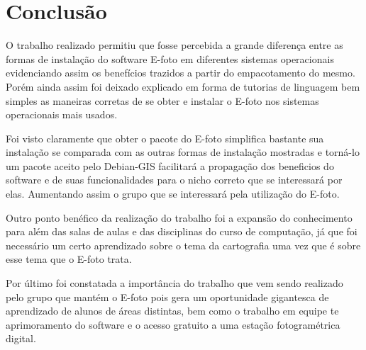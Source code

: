 \chapter{Conclusão}

O trabalho realizado permitiu que fosse percebida a grande diferença entre as formas de instalação do software E-foto em diferentes sistemas operacionais evidenciando assim os benefícios trazidos a partir do empacotamento do mesmo. Porém ainda assim foi deixado explicado em forma de tutorias de linguagem bem simples as maneiras corretas de se obter e instalar o E-foto nos sistemas operacionais mais usados.

Foi visto claramente que obter o pacote do E-foto simplifica bastante sua instalação se comparada com as outras formas de instalação mostradas e torná-lo um pacote aceito pelo Debian-GIS facilitará a propagação dos beneficios do software e de suas funcionalidades para o nicho correto que se interessará por elas. Aumentando assim o grupo que se interessará pela utilização do E-foto. 

Outro ponto benéfico da realização do trabalho foi a expansão do conhecimento para além das salas de aulas e das disciplinas do curso de computação, já que foi necessário um certo aprendizado sobre o tema da cartografia uma vez que é sobre esse tema que o E-foto trata.

Por último foi constatada a importância do trabalho que vem sendo realizado pelo grupo que mantém o E-foto pois gera um oportunidade gigantesca de aprendizado de alunos de áreas distintas, bem como o trabalho em equipe te aprimoramento do software e o acesso gratuito a uma estação fotogramétrica digital.     
